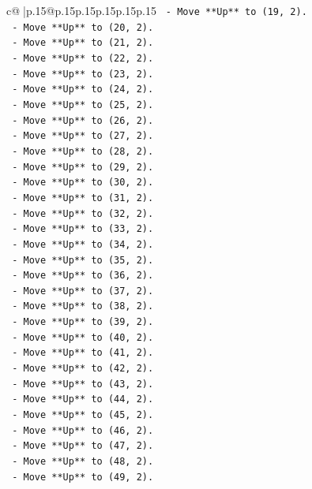 \documentclass{article}
\begin{document}
{\begin{supertabular}{c@{$\;$}|p{.15\linewidth}@{}p{.15\linewidth}p{.15\linewidth}p{.15\linewidth}p{.15\linewidth}p{.15\linewidth}}
{{{\texttt{    {-} Move **Up** to (19, 2).} \\
\texttt{    {-} Move **Up** to (20, 2).} \\
\texttt{    {-} Move **Up** to (21, 2).} \\
\texttt{    {-} Move **Up** to (22, 2).} \\
\texttt{    {-} Move **Up** to (23, 2).} \\
\texttt{    {-} Move **Up** to (24, 2).} \\
\texttt{    {-} Move **Up** to (25, 2).} \\
\texttt{    {-} Move **Up** to (26, 2).} \\
\texttt{    {-} Move **Up** to (27, 2).} \\
\texttt{    {-} Move **Up** to (28, 2).} \\
\texttt{    {-} Move **Up** to (29, 2).} \\
\texttt{    {-} Move **Up** to (30, 2).} \\
\texttt{    {-} Move **Up** to (31, 2).} \\
\texttt{    {-} Move **Up** to (32, 2).} \\
\texttt{    {-} Move **Up** to (33, 2).} \\
\texttt{    {-} Move **Up** to (34, 2).} \\
\texttt{    {-} Move **Up** to (35, 2).} \\
\texttt{    {-} Move **Up** to (36, 2).} \\
\texttt{    {-} Move **Up** to (37, 2).} \\
\texttt{    {-} Move **Up** to (38, 2).} \\
\texttt{    {-} Move **Up** to (39, 2).} \\
\texttt{    {-} Move **Up** to (40, 2).} \\
\texttt{    {-} Move **Up** to (41, 2).} \\
\texttt{    {-} Move **Up** to (42, 2).} \\
\texttt{    {-} Move **Up** to (43, 2).} \\
\texttt{    {-} Move **Up** to (44, 2).} \\
\texttt{    {-} Move **Up** to (45, 2).} \\
\texttt{    {-} Move **Up** to (46, 2).} \\
\texttt{    {-} Move **Up** to (47, 2).} \\
\texttt{    {-} Move **Up** to (48, 2).} \\
\texttt{    {-} Move **Up** to (49, 2).} \\
}}}
\end{supertabular}}
\end{document}
